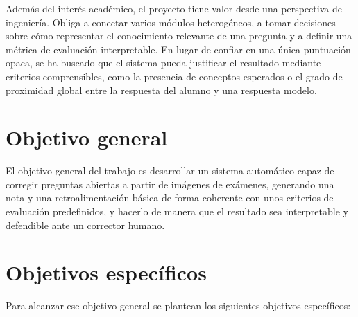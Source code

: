 Además del interés académico, el proyecto tiene valor desde una perspectiva de ingeniería. Obliga a conectar varios módulos heterogéneos, a tomar decisiones sobre cómo representar el conocimiento relevante de una pregunta y a definir una métrica de evaluación interpretable. En lugar de confiar en una única puntuación opaca, se ha buscado que el sistema pueda justificar el resultado mediante criterios comprensibles, como la presencia de conceptos esperados o el grado de proximidad global entre la respuesta del alumno y una respuesta modelo.

\section{Objetivo general}

El objetivo general del trabajo es desarrollar un sistema automático capaz de corregir preguntas abiertas a partir de imágenes de exámenes, generando una nota y una retroalimentación básica de forma coherente con unos criterios de evaluación predefinidos, y hacerlo de manera que el resultado sea interpretable y defendible ante un corrector humano.

\section{Objetivos específicos}

Para alcanzar ese objetivo general se plantean los siguientes objetivos específicos:

